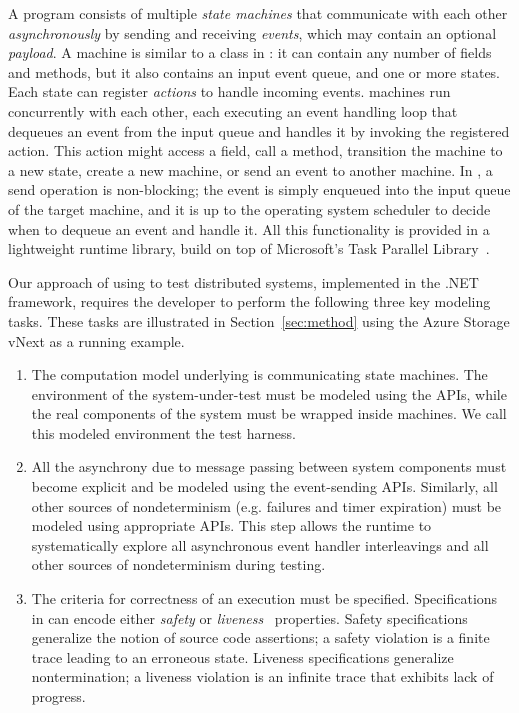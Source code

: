 A \psharp program consists of multiple \emph{state machines} that communicate with each other \emph{asynchronously} by sending and receiving \emph{events}, which may contain an optional \emph{payload}. A \psharp machine is similar to a class in \csharp: it can contain any number of fields and methods, but it also contains an input event queue, and one or more states. Each state can register \emph{actions} to handle incoming events. \psharp machines run concurrently with each other, each executing an event handling loop that dequeues an event from the input queue and handles it by invoking the registered action. This action might access a field, call a method, transition the machine to a new state, create a new machine, or send an event to another machine. In \psharp, a send operation is non-blocking; the event is simply enqueued into the input queue of the target machine, and it is up to the operating system scheduler to decide when to dequeue an event and handle it. All this functionality is provided in a lightweight runtime library, build on top of Microsoft's Task Parallel Library~\cite{leijen2009tpl}.

Our approach of using \psharp to test distributed systems, implemented in the .NET framework, requires the developer to perform the following three key modeling tasks. These tasks are illustrated in Section~\ref{sec:method} using the Azure Storage vNext as a running example.
\begin{enumerate}
\item
The computation model underlying \psharp is communicating state machines. The environment of the system-under-test must be modeled using the \psharp APIs, while the real components of the system must be wrapped inside \psharp machines. We call this modeled environment the \psharp test harness.

\item
All the asynchrony due to message passing between system components must become explicit and be modeled using the \psharp event-sending APIs. Similarly, all other sources of nondeterminism (e.g. failures and timer expiration) must be modeled using appropriate \psharp APIs. This step allows the \psharp runtime to systematically explore all asynchronous event handler interleavings and all other sources of nondeterminism during testing.

\item
The criteria for correctness of an execution must be specified. Specifications in \psharp can encode either \emph{safety} or \emph{liveness}~\cite{lamport1977proving} properties. Safety specifications generalize the notion of source code assertions; a safety violation is a finite trace leading to an erroneous state. Liveness specifications generalize nontermination; a liveness violation is an infinite trace that exhibits lack of progress.
\end{enumerate}


